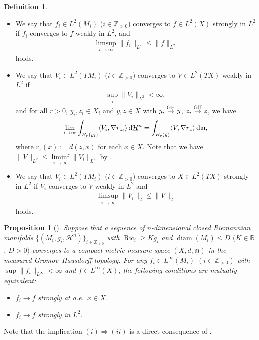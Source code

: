 \documentclass[pdftex]{sigma}
\numberwithin{equation}{section}
\newtheorem{Prop}[Thm]{Proposition}
\theoremstyle{definition}
\newtheorem{Def}[Thm]{Definition}
\newcommand{\Ric}{\operatorname{Ric}}
\newcommand{\diam}{\operatorname{diam}}
\newcommand{\R}{\mathbb{R}}
\newcommand{\Z}{\mathbb{Z}}
\newcommand{\mf}{\mathfrak{m}}
\newcommand{\nHa}{\underline{\mathcal{H}}}
\begin{document}
\begin{Def}
\begin{itemize}
\begin{gather*}
\end{gather*}
and for all $r>0$, $x_i\in M_i$ and $x\in X$ with $x_i \stackrel{{\rm GH}}{\to} x$, we have
\begin{gather*}
\lim_{i\to \infty}\int_{B_r(x_i)} f_i \,{\rm d}\nHa^n=\int_{B_r(x)} f \,{\rm d}\mf.
\end{gather*}
Note that we have $\|f\|_{L^2}\leq \liminf\limits_{i\to\infty}\|f_i\|_{L^2}$ by \cite[Proposition~3.29]{Ho1}.
\item We say that $f_i\in L^2(M_i)$ ($i\in\Z_{>0}$) converges to $f\in L^2(X)$ strongly in $L^2$ \cite[Definition~3.21 and Proposition~3.31]{Ho1} if $f_i$ converges to $f$ weakly in $L^2$, and
\begin{gather*}
\limsup_{i\to \infty} \|f_i\|_{L^2}\leq \|f\|_{L^2}
\end{gather*}
holds.
\item We say that $V_i\in L^2(T M_i)$ ($i\in\Z_{>0}$) converges to $V\in L^2(T X)$ weakly in $L^2$ \cite[Definition~3.42]{Ho1} if
\begin{gather*}
\sup_{i}\|V_i\|_{L^2}<\infty,
\end{gather*}
and for all $r>0$, $y_i,z_i\in X_i$ and $y,z\in X$ with $y_i\stackrel{{\rm GH}}{\to} y$, $z_i\stackrel{{\rm GH}}\to z$, we have
\begin{gather*}
\lim_{i\to \infty}\int_{B_r(y_i)} \langle V_i, \nabla r_{z_i}\rangle \,{\rm d}\nHa^n=\int_{B_r(y)} \langle V, \nabla r_{z}\rangle \,{\rm d}\mf,
\end{gather*}
where $r_z(x):=d(z,x)$ for each $x\in X$.
Note that we have $\|V\|_{L^2}\leq \liminf\limits_{i\to \infty}\|V_i\|_{L^2}$ by \cite[Proposition~3.64]{Ho1}.
\item We say that $V_i\in L^2(T M_i)$ ($i\in\Z_{>0}$) converges to $X\in L^2(T X)$ strongly in $L^2$ \cite[Definition~3.58 and~Proposition~3.66]{Ho1} if $V_i$ converges to $V$ weakly in $L^2$ and
\begin{gather*}
\limsup_{i\to \infty} \|V_i\|_2\leq \|V\|_2
\end{gather*}
holds.
\end{itemize}

\end{Def}
\begin{Prop}[{\cite[Proposition~3.32]{Ho1}}]\label{eqconv}
Suppose that a sequence of $n$-dimensional closed Riemannian manifolds $\{(M_i,g_i,\nHa^n)\}_{i\in \Z_{>0}}$ with $\Ric_i\geq K g_i$ and $\diam (M_i)\leq D$ $(K\in \R$, \mbox{$D>0)$} converges to a compact metric measure space $(X,d,\mf)$ in the measured Gromov--Hausdorff topo\-logy.
For any $f_i\in L^\infty(M_i)$ $(i\in\Z_{>0})$ with $\sup\|f_i\|_{L^\infty}<\infty$ and $f\in L^\infty (X)$, the following conditions are mutually equivalent:
\begin{itemize}\itemsep=0pt
\item[$(i)$] $f_i\to f$ strongly at a.e.\ $x\in X$.
\item[$(ii)$] $f_i\to f$ strongly in $L^2$.
\end{itemize}
\end{Prop}
Note that the implication $(i)\Rightarrow (ii)$ is a direct consequence of \cite[Definitions~3.21 and~3.25, Proposition~3.24]{Ho1}.
\end{document}
